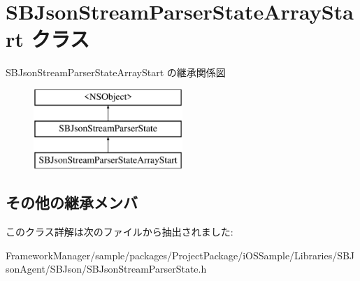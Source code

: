 \hypertarget{interface_s_b_json_stream_parser_state_array_start}{}\section{S\+B\+Json\+Stream\+Parser\+State\+Array\+Start クラス}
\label{interface_s_b_json_stream_parser_state_array_start}
S\+B\+Json\+Stream\+Parser\+State\+Array\+Start の継承関係図\begin{figure}[H]
\begin{center}
\leavevmode
\includegraphics[height=3.000000cm]{interface_s_b_json_stream_parser_state_array_start}
\end{center}
\end{figure}
\subsection*{その他の継承メンバ}


このクラス詳解は次のファイルから抽出されました\+:\begin{DoxyCompactItemize}
\item 
Framework\+Manager/sample/packages/\+Project\+Package/i\+O\+S\+Sample/\+Libraries/\+S\+B\+Json\+Agent/\+S\+B\+Json/S\+B\+Json\+Stream\+Parser\+State.\+h\end{DoxyCompactItemize}
